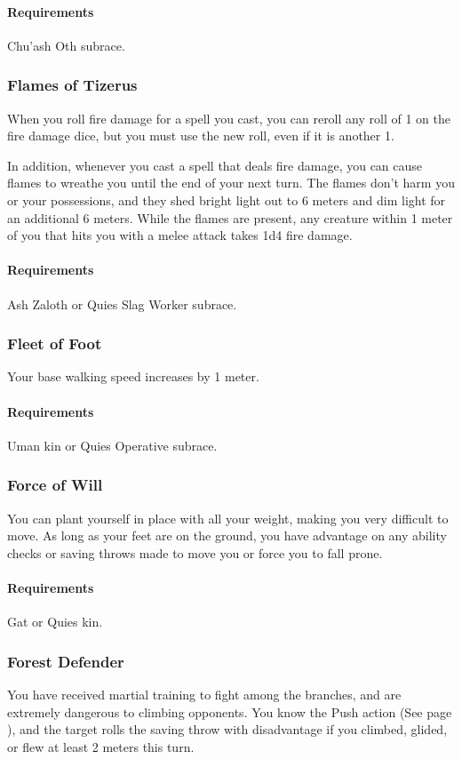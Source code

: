     \paragraph{Requirements} Chu'ash Oth subrace.
\subsubsection{Flames of Tizerus} \label{feat::flamesoftizerus}
    When you roll fire damage for a spell you cast, you can reroll any roll of 1 on the fire damage dice, but you must use the new roll, even if it is another 1.

    In addition, whenever you cast a spell that deals fire damage, you can cause flames to wreathe you until the end of your next turn.
    The flames don't harm you or your possessions, and they shed bright light out to 6 meters and dim light for an additional 6 meters.
    While the flames are present, any creature within 1 meter of you that hits you with a melee attack takes 1d4 fire damage.
    \paragraph{Requirements} Ash Zaloth or Quies Slag Worker subrace.
\subsubsection{Fleet of Foot} \label{feat::fleetoffoot}
    Your base walking speed increases by 1 meter.
    \paragraph{Requirements} Uman kin or Quies Operative subrace.
\subsubsection{Force of Will} \label{feat::forceofwill}
    You can plant yourself in place with all your weight, making you very difficult to move.
    As long as your feet are on the ground, you have advantage on any ability checks or saving throws made to move you or force you to fall prone.
    \paragraph{Requirements} Gat or Quies kin.
\subsubsection{Forest Defender} \label{feat::forestdefender}
    You have received martial training to fight among the branches, and are extremely dangerous to climbing opponents.
    You know the Push action (See page \pageref{act::push}), and the target rolls the saving throw with disadvantage if you climbed, glided, or flew at least 2 meters this turn.
